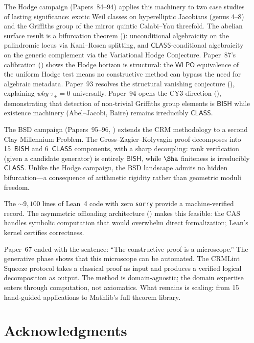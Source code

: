 \documentclass[11pt]{article}
\theoremstyle{plain}
\theoremstyle{definition}
\theoremstyle{remark}
\newcommand{\BISH}{\mathsf{BISH}}
\newcommand{\WLPO}{\mathsf{WLPO}}
\newcommand{\CLASS}{\mathsf{CLASS}}
\begin{document}
The Hodge campaign (Papers~84--94) applies this machinery to two
case studies of lasting significance: exotic Weil classes on
hyperelliptic Jacobians (genus 4--8) and the Griffiths group of
the mirror quintic Calabi--Yau threefold.  The abelian surface
result is a bifurcation theorem (): unconditional
algebraicity on the palindromic locus via Kani--Rosen splitting,
and $\CLASS$-conditional algebraicity on the generic complement
via the Variational Hodge Conjecture.  Paper~87's calibration
() shows the Hodge horizon is structural: the
$\WLPO$ equivalence of the uniform Hodge test means no
constructive method can bypass the need for algebraic metadata.
Paper~93 resolves the structural vanishing conjecture
(), explaining \emph{why} $\tau_+ = 0$ universally.
Paper~94 opens the CY3 direction (), demonstrating
that detection of non-trivial Griffiths group elements is $\BISH$
while existence machinery (Abel--Jacobi, Baire) remains
irreducibly $\CLASS$.

The BSD campaign (Papers~95--96, ) extends the CRM
methodology to a second Clay Millennium Problem.  The
Gross--Zagier--Kolyvagin proof decomposes into 15~$\BISH$ and
6~$\CLASS$ components, with a sharp decoupling: rank verification
(given a candidate generator) is entirely $\BISH$, while
$\Sha$ finiteness is
irreducibly $\CLASS$.  Unlike the Hodge campaign, the BSD
landscape admits no hidden bifurcation---a consequence of
arithmetic rigidity rather than geometric moduli freedom.

The ${\sim}9{,}100$ lines of Lean~4 code with zero \texttt{sorry}
provide a machine-verified record.  The asymmetric offloading
architecture () makes this feasible: the CAS handles
symbolic computation that would overwhelm direct formalization;
Lean's kernel certifies correctness.

Paper~67 ended with the sentence: ``The constructive proof is a
microscope.''  The generative phase shows that this microscope
can be automated.  The CRMLint Squeeze protocol takes a classical
proof as input and produces a verified logical decomposition as
output.  The method is domain-agnostic; the domain expertise
enters through computation, not axiomatics.  What remains is
scaling: from 15 hand-guided applications to Mathlib's full
theorem library.


\section*{Acknowledgments}
\end{document}
